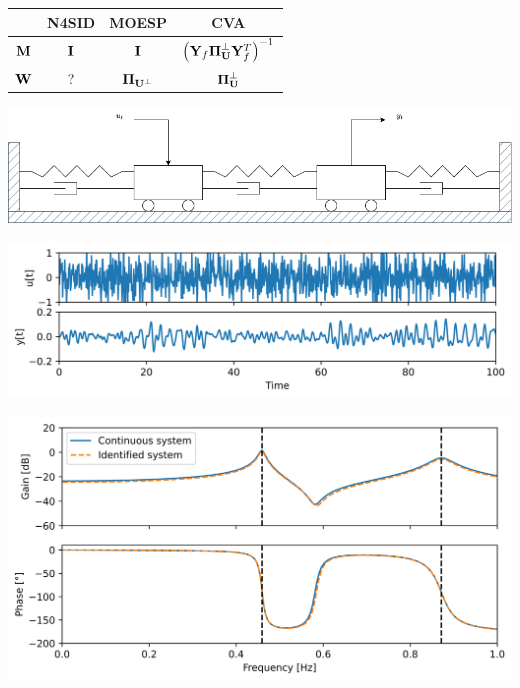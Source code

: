 \documentclass[aspectratio=169,compress,12pt,dvipsnames]{beamer}
\begin{document}
\begin{frame}
    \vfill
    \centering
    \begin{tabular}{cccc}
        &   N4SID   &   MOESP   &   CVA \\
        \hline
        $\vb{M}$    &   $\vb{I}$    &   $\vb{I}$    &   $\left( \vb{Y}_f \boldsymbol{\Pi}_{\vb{U}}^{\perp} \vb{Y}_f^T \right)^{-1}$ \\
        $\vb{W}$    &   ?           &   $\boldsymbol{\Pi}_{\vb{U}^{\perp}}$   &   $\boldsymbol{\Pi}_{\vb{U}}^{\perp}$ 
    \end{tabular}
    \vfill
\end{frame}

\begin{frame}
    \vfill
    \centering
    \includegraphics[width=.8\textwidth]{mechanical_system.png}
    \vfill
\end{frame}

\begin{frame}
    \vfill
    \centering
    \includegraphics[width=.8\textwidth]{io_data.png}
    \vfill
\end{frame}

\begin{frame}
    \vfill
    \centering
    \includegraphics[width=.8\textwidth]{identified_rfr.png}
    \vfill
\end{frame}
\end{document}
